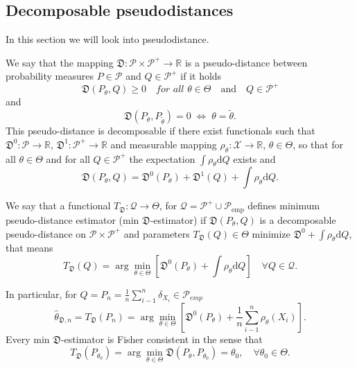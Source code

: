 \subsection{Decomposable pseudodistances}

In this section we will look into \ren pseudodistance. 
		
		\begin{definition}
	We say that the mapping $\mathfrak{D}:\mathcal{P}\times\mathcal{P}^+ \rightarrow \mathbb{R}$ is a pseudo-distance between probability measures $P \in \mathcal{P}$ and $Q \in \mathcal{P}^+$ if it holds		
		\begin{equation}
			\mathfrak{D}(P_\theta,Q) \geq 0 \quad \textit{for all } \theta \in \Theta \quad \text{and} \quad Q \in \mathcal{P}^+
		\end{equation}
		and 		
		\begin{equation}
			\mathfrak{D}(P_\theta,P_{\tilde{\theta}})=0 \; \Leftrightarrow \; \theta=\tilde{\theta}.
		\end{equation}	
	This pseudo-distance is decomposable if there exist functionals such that
		 $\mathfrak{D}^0:\mathcal{P}\rightarrow\mathbb{R}$, $ \mathfrak{D}^1:\mathcal{P}^+ \rightarrow \mathbb{R}$ and measurable mapping
		  $\rho_\theta : \mathcal{X} \rightarrow \mathbb{R}$, $ \theta \in \Theta$, so that for all $\theta \in \Theta$ and for all $Q \in \mathcal{P}^+$ the expectation $\int{\rho_\theta }\mathrm{d}Q$ exists and
		\begin{equation}
			\mathfrak{D} (P_\theta, Q) = \mathfrak{D}^0 (P_\theta) + \mathfrak{D}^1 (Q) + \int \rho_\theta \mathrm{d}Q.
		\end{equation}
\end{definition}

\begin{definition}
	We say that a functional $T_\mathfrak{D}:\mathcal{Q} \rightarrow \Theta$, for $\mathcal{Q}=\mathcal{P}^+ \cup \mathcal{P}_{\text{emp}}$	defines minimum pseudo-distance estimator (min $\mathfrak{D}$-estimator) if $\mathfrak{D}(P_\theta,Q)$ is a decomposable pseudo-distance on $\mathcal{P}\times\mathcal{P}^+$ and parameters $T_\mathfrak{D}(Q) \in \Theta$ minimize $\mathfrak{D}^0 + \int{\rho_\theta}\mathrm{d}Q$, that means
	\begin{equation}
		T_\mathfrak{D}(Q) = \arg\min_{\theta \in \Theta} \left[ \mathfrak{D}^0(P_\theta) + \int{\rho_\theta}\mathrm{d}Q \right] \quad \forall Q \in \mathcal{Q}.
	\end{equation}
\end{definition}
In particular, for $Q = P_n = \frac{1}{n}\sum_{i-1}^n \delta_{X_i} \in \mathcal{P}_{emp}$
\begin{equation}
	\hat{\theta}_{\mathfrak{D},n} =T_\mathfrak{D}(P_n)  = \arg\min_{\theta \in \Theta}\left[ \mathfrak{D}^0(P_\theta) + \dfrac{1}{n} \sum_{i-1}^n \rho_\theta (X_i) \right].
\end{equation}
Every min $\mathfrak{D}$-estimator is Fisher consistent in the sense that
\begin{equation}
	T_\mathfrak{D}(P_{\theta_0}) = \arg\min_{\theta \in \Theta} \mathfrak{D}(P_\theta, P_{\theta_0}) = \theta_0,\quad \forall \theta_0 \in \Theta.
\end{equation}

